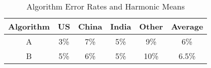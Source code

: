 \documentclass{article}
\begin{document}
\begin{table}[ht]
\begin{center}
\begin{tabular}[h]{c | c | c | c | c | c}
Algorithm & US & China & India & Other & Average \\ \hline
A & 3\% & 7\% & 5\% & 9\% & 6\% \\
B & 5\% & 6\% & 5\% & 10\% & 6.5\%
\end{tabular}
\caption{Algorithm Error Rates and Harmonic Means} \label{tbl:error_rates}
\end{center}
\end{table}
\end{document}
